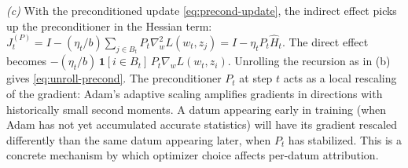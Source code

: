 \documentclass[11pt]{article}
\begin{document}
\begin{solution}
\textit{(c)} With the preconditioned update \eqref{eq:precond-update}, the indirect effect picks up the preconditioner in the Hessian term: $J_t^{(P)} = I - (\eta_t/b)\sum_{j\in B_t}P_t\nabla_w^2 L(w_t,z_j) = I - \eta_t P_t \widehat{H}_t$. The direct effect becomes $-(\eta_t/b)\,\mathbf{1}[i\in B_t]\,P_t\nabla_w L(w_t,z_i)$. Unrolling the recursion as in (b) gives \eqref{eq:unroll-precond}. The preconditioner $P_t$ at step $t$ acts as a local rescaling of the gradient: Adam's adaptive scaling amplifies gradients in directions with historically small second moments. A datum appearing early in training (when Adam has not yet accumulated accurate statistics) will have its gradient rescaled differently than the same datum appearing later, when $P_t$ has stabilized. This is a concrete mechanism by which optimizer choice affects per-datum attribution.

\end{solution}
\end{document}
